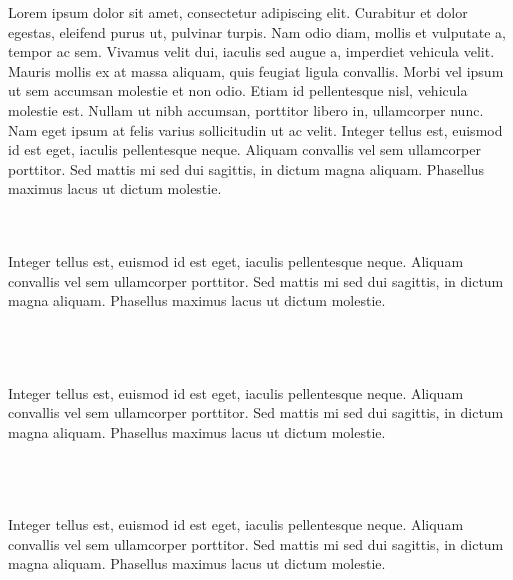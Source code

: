Lorem ipsum dolor sit amet, consectetur adipiscing elit. Curabitur et dolor egestas, eleifend purus ut, pulvinar turpis. Nam odio diam, mollis et vulputate a, tempor ac sem. Vivamus velit dui, iaculis sed augue a, imperdiet vehicula velit. Mauris mollis ex at massa aliquam, quis feugiat ligula convallis. Morbi vel ipsum ut sem accumsan molestie et non odio. Etiam id pellentesque nisl, vehicula molestie est. Nullam ut nibh accumsan, porttitor libero in, ullamcorper nunc. Nam eget ipsum at felis varius sollicitudin ut ac velit. Integer tellus est, euismod id est eget, iaculis pellentesque neque. Aliquam convallis vel sem ullamcorper porttitor. Sed mattis mi sed dui sagittis, in dictum magna aliquam. Phasellus maximus lacus ut dictum molestie.

\\
\\
Integer tellus est, euismod id est eget, iaculis pellentesque neque. Aliquam convallis vel sem ullamcorper porttitor. Sed mattis mi sed dui sagittis, in dictum magna aliquam. Phasellus maximus lacus ut dictum molestie.
\\
\\
\\
\\
Integer tellus est, euismod id est eget, iaculis pellentesque neque. Aliquam convallis vel sem ullamcorper porttitor. Sed mattis mi sed dui sagittis, in dictum magna aliquam. Phasellus maximus lacus ut dictum molestie.
\\
\\
\\
\\
Integer tellus est, euismod id est eget, iaculis pellentesque neque. Aliquam convallis vel sem ullamcorper porttitor. Sed mattis mi sed dui sagittis, in dictum magna aliquam. Phasellus maximus lacus ut dictum molestie.
\\
\\
